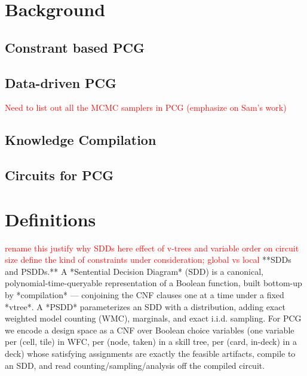 \documentclass[letterpaper]{article} %
\newcommand{\todo}[1]{\textcolor{red}{#1}}
\begin{document}
\section{Background}
\subsection{Constrant based PCG}
\subsection{Data-driven PCG}
\todo{Need to list out all the MCMC samplers in PCG (emphasize on Sam's work) }
\subsection{Knowledge Compilation}
\subsection{Circuits for PCG}

\section{Definitions}
\todo{rename this}
\todo{justify why SDDs here}
\todo{effect of v-trees and variable order on circuit size}
\todo{define the kind of constraints under consideration; global vs local}
**SDDs and PSDDs.** A *Sentential Decision Diagram* (SDD) is a canonical, polynomial-time-queryable
representation of a Boolean function, built bottom-up by *compilation* — conjoining the CNF clauses
one at a time under a fixed *vtree*. A *PSDD* parameterizes an SDD with a distribution, adding exact
weighted model counting (WMC), marginals, and exact i.i.d. sampling. For PCG we encode a design space
as a CNF over Boolean choice variables (one variable per (cell, tile) in WFC, per (node, taken) in a
skill tree, per (card, in-deck) in a deck) whose satisfying assignments are exactly the feasible
artifacts, compile to an SDD, and read counting/sampling/analysis off the compiled circuit.
\end{document}
